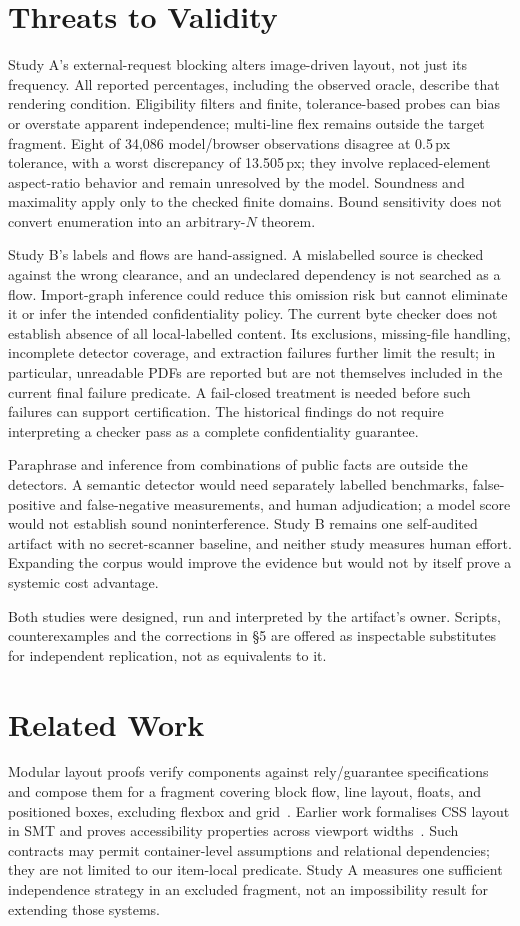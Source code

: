 \documentclass[acmsmall,screen,review,anonymous,nonacm]{acmart}
\begin{document}
\section{Threats to Validity}
Study A's external-request blocking alters image-driven layout, not just its frequency. All reported percentages, including the observed oracle, describe that rendering condition. Eligibility filters and finite, tolerance-based probes can bias or overstate apparent independence; multi-line flex remains outside the target fragment. Eight of 34{,}086 model/browser observations disagree at 0.5\,px tolerance, with a worst discrepancy of 13.505\,px; they involve replaced-element aspect-ratio behavior and remain unresolved by the model. Soundness and maximality apply only to the checked finite domains. Bound sensitivity does not convert enumeration into an arbitrary-$N$ theorem.

Study B's labels and flows are hand-assigned. A mislabelled source is checked against the wrong clearance, and an undeclared dependency is not searched as a flow. Import-graph inference could reduce this omission risk but cannot eliminate it or infer the intended confidentiality policy. The current byte checker does not establish absence of all local-labelled content. Its exclusions, missing-file handling, incomplete detector coverage, and extraction failures further limit the result; in particular, unreadable PDFs are reported but are not themselves included in the current final failure predicate. A fail-closed treatment is needed before such failures can support certification. The historical findings do not require interpreting a checker pass as a complete confidentiality guarantee.

Paraphrase and inference from combinations of public facts are outside the detectors. A semantic detector would need separately labelled benchmarks, false-positive and false-negative measurements, and human adjudication; a model score would not establish sound noninterference. Study B remains one self-audited artifact with no secret-scanner baseline, and neither study measures human effort. Expanding the corpus would improve the evidence but would not by itself prove a systemic cost advantage.

Both studies were designed, run and interpreted by the artifact's owner. Scripts, counterexamples and the corrections in \S5 are offered as inspectable substitutes for independent replication, not as equivalents to it.

\section{Related Work}
Modular layout proofs verify components against rely/guarantee specifications and compose them for a fragment covering block flow, line layout, floats, and positioned boxes, excluding flexbox and grid~\cite{troika2019}. Earlier work formalises CSS layout in SMT and proves accessibility properties across viewport widths~\cite{cassius2018}. Such contracts may permit container-level assumptions and relational dependencies; they are not limited to our item-local predicate. Study A measures one sufficient independence strategy in an excluded fragment, not an impossibility result for extending those systems.
\end{document}
